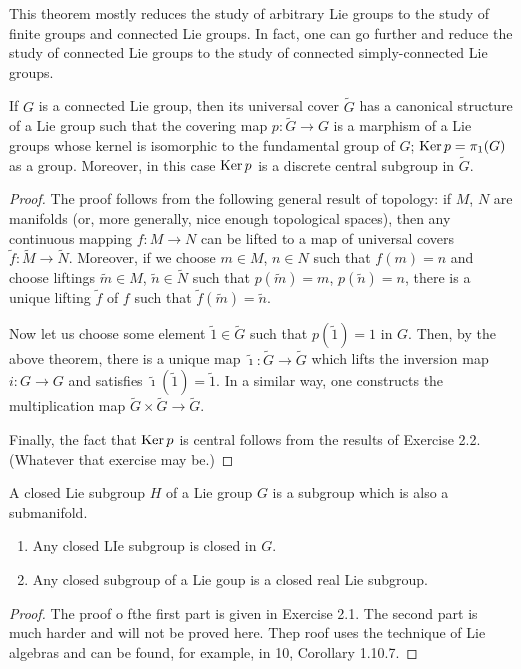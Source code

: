 This theorem mostly reduces the study of arbitrary Lie groups to the study
of finite groups and connected Lie groups. In fact, one can go further and
reduce the study of connected Lie groups to the study of connected
simply-connected Lie groups.

\begin{theorem}
  If $G$ is a connected Lie group, then its universal cover $\tilde G$ has
  a canonical structure of a Lie group such that the covering map
  $p\colon\tilde G\to G$ is a marphism of a Lie groups whose kernel is
  isomorphic to the fundamental group of $G$; $\operatorname{Ker} p=\pi_1(G)$ as a
  group. Moreover, in this case $\operatorname{Ker} p$ is a discrete central subgroup in
  $\tilde G$.
\end{theorem}
\begin{proof}
  The proof follows from the following general result of topology: if $M$,
  $N$ are manifolds (or, more generally, nice enough topological spaces),
  then any continuous mapping $f\colon M\to N$ can be lifted to a map of
  universal covers $\tilde f\colon \tilde M\to\tilde N$. Moreover, if we
  choose $m\in M$, $n\in N$ such that $f(m)=n$ and choose liftings
  $\tilde m\in M$, $\tilde n\in\tilde N$ such that $p(\tilde m)=m$,
  $p(\tilde n)=n$, there is a unique lifting $\tilde f$ of $f$ such that
  $\tilde f(\tilde m)=\tilde n$.

  Now let us choose some element $\tilde 1\in\tilde G$ such that
  $p(\tilde 1)=1$ in $G$. Then, by the above theorem, there is a unique map
  $\tilde\imath\colon\tilde G\to\tilde G$ which lifts the inversion map
  $i\colon G\to G$ and satisfies $\tilde\imath(\tilde 1)=\tilde 1$. In a
  similar way, one constructs the multiplication map
  $\tilde G\times\tilde G\to\tilde G$.

  Finally, the fact that $\operatorname{Ker} p$ is central follows from the results of
  Exercise 2.2. (Whatever that exercise may be.)
\end{proof}

\begin{definition}
  A closed Lie subgroup $H$ of a Lie group $G$ is a subgroup which is also
  a submanifold.
\end{definition}

\begin{theorem}
  \begin{enumerate}[label=\textnormal{(\arabic*)}]
  \item Any closed LIe subgroup is closed in $G$.
  \item Any closed subgroup of a Lie goup is a closed real Lie subgroup.
  \end{enumerate}
\end{theorem}
\begin{proof}
  The proof o fthe first part is given in Exercise 2.1. The second part is
  much harder and will not be proved here. Thep roof uses the technique of
  Lie algebras and can be found, for example, in 10, Corollary 1.10.7.
\end{proof}

